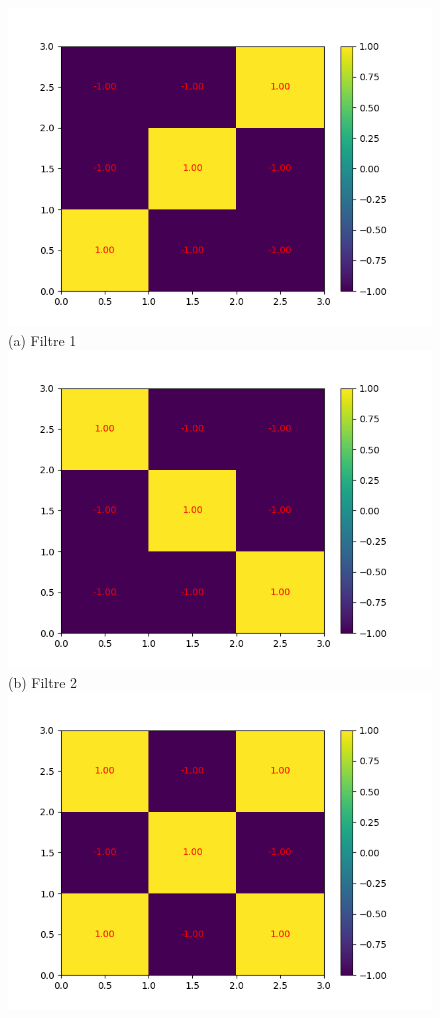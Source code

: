 \begin{figure}[h]
        \includegraphics[width=\textwidth]{img/cnn_exemple/cross/filtre_1.png}
        \center
        (a) Filtre 1
    \endminipage\hfill
        \includegraphics[width=\textwidth]{img/cnn_exemple/cross/filtre_2.png}
        \center
        (b) Filtre 2
    \endminipage\hfill
        \includegraphics[width=\textwidth]{img/cnn_exemple/cross/filtre_3.png}

\end{figure}
